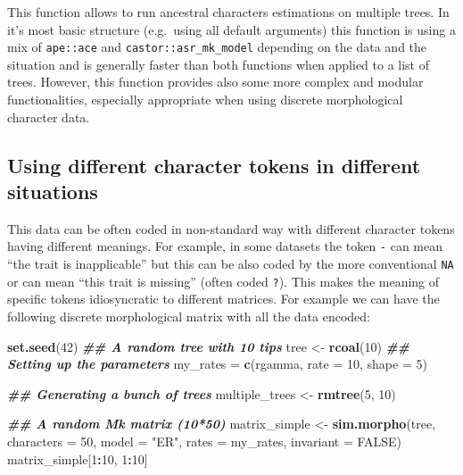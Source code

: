 \documentclass[
]{book}
\newenvironment{Shaded}{\begin{snugshade}}{\end{snugshade}}
\newcommand{\AttributeTok}[1]{\textcolor[rgb]{0.13,0.29,0.53}{#1}}
\newcommand{\ConstantTok}[1]{\textcolor[rgb]{0.56,0.35,0.01}{#1}}
\newcommand{\DecValTok}[1]{\textcolor[rgb]{0.00,0.00,0.81}{#1}}
\newcommand{\DocumentationTok}[1]{\textcolor[rgb]{0.56,0.35,0.01}{\textbf{\textit{#1}}}}
\newcommand{\FunctionTok}[1]{\textcolor[rgb]{0.13,0.29,0.53}{\textbf{#1}}}
\newcommand{\NormalTok}[1]{#1}
\newcommand{\OtherTok}[1]{\textcolor[rgb]{0.56,0.35,0.01}{#1}}
\newcommand{\SpecialCharTok}[1]{\textcolor[rgb]{0.81,0.36,0.00}{\textbf{#1}}}
\newcommand{\StringTok}[1]{\textcolor[rgb]{0.31,0.60,0.02}{#1}}
\begin{document}
This function allows to run ancestral characters estimations on multiple trees.
In it's most basic structure (e.g.~using all default arguments) this function is using a mix of \texttt{ape::ace} and \texttt{castor::asr\_mk\_model} depending on the data and the situation and is generally faster than both functions when applied to a list of trees.
However, this function provides also some more complex and modular functionalities, especially appropriate when using discrete morphological character data.

\hypertarget{using-different-character-tokens-in-different-situations}{%
\subsection{Using different character tokens in different situations}\label{using-different-character-tokens-in-different-situations}}

This data can be often coded in non-standard way with different character tokens having different meanings.
For example, in some datasets the token \texttt{-} can mean ``the trait is inapplicable'' but this can be also coded by the more conventional \texttt{NA} or can mean ``this trait is missing'' (often coded \texttt{?}).
This makes the meaning of specific tokens idiosyncratic to different matrices.
For example we can have the following discrete morphological matrix with all the data encoded:

\begin{Shaded}
\begin{Highlighting}[]
\FunctionTok{set.seed}\NormalTok{(}\DecValTok{42}\NormalTok{)}
\DocumentationTok{\#\# A random tree with 10 tips}
\NormalTok{tree }\OtherTok{\textless{}{-}} \FunctionTok{rcoal}\NormalTok{(}\DecValTok{10}\NormalTok{)}
\DocumentationTok{\#\# Setting up the parameters}
\NormalTok{my\_rates }\OtherTok{=} \FunctionTok{c}\NormalTok{(rgamma, }\AttributeTok{rate =} \DecValTok{10}\NormalTok{, }\AttributeTok{shape =} \DecValTok{5}\NormalTok{)}

\DocumentationTok{\#\# Generating a bunch of trees}
\NormalTok{multiple\_trees }\OtherTok{\textless{}{-}} \FunctionTok{rmtree}\NormalTok{(}\DecValTok{5}\NormalTok{, }\DecValTok{10}\NormalTok{)}

\DocumentationTok{\#\# A random Mk matrix (10*50)}
\NormalTok{matrix\_simple }\OtherTok{\textless{}{-}} \FunctionTok{sim.morpho}\NormalTok{(tree, }\AttributeTok{characters =} \DecValTok{50}\NormalTok{, }\AttributeTok{model =} \StringTok{"ER"}\NormalTok{, }\AttributeTok{rates =}\NormalTok{ my\_rates,}
                            \AttributeTok{invariant =} \ConstantTok{FALSE}\NormalTok{)}
\NormalTok{matrix\_simple[}\DecValTok{1}\SpecialCharTok{:}\DecValTok{10}\NormalTok{, }\DecValTok{1}\SpecialCharTok{:}\DecValTok{10}\NormalTok{]}
\end{Highlighting}
\end{Shaded}
\end{document}
